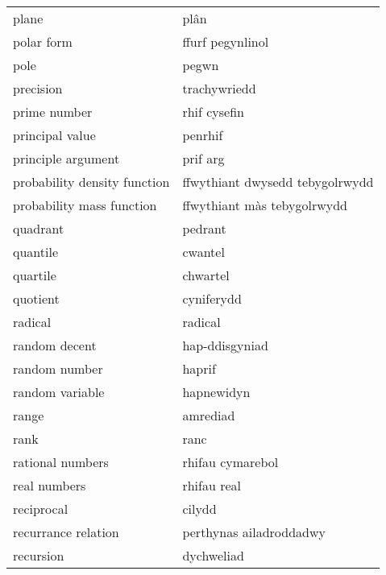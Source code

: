 \begin{supertabular}{p{0.22\textwidth}p{0.22\textwidth}}
                            plane &                             plân \\
                       polar form &                 ffurf pegynlinol \\
                             pole &                            pegwn \\
                        precision &                     trachywriedd \\
                     prime number &                     rhif cysefin \\
                  principal value &                          penrhif \\
               principle argument &                         prif arg \\
     probability density function &  ffwythiant dwysedd tebygolrwydd \\
        probability mass function &      ffwythiant màs tebygolrwydd \\
                         quadrant &                          pedrant \\
                         quantile &                          cwantel \\
                         quartile &                         chwartel \\
                         quotient &                       cyniferydd \\
                          radical &                          radical \\
                    random decent &                   hap-ddisgyniad \\
                    random number &                           haprif \\
                  random variable &                       hapnewidyn \\
                            range &                         amrediad \\
                             rank &                             ranc \\
                 rational numbers &                 rhifau cymarebol \\
                     real numbers &                      rhifau real \\
                       reciprocal &                           cilydd \\
              recurrance relation &          perthynas ailadroddadwy \\
                        recursion &                       dychweliad \\

\end{supertabular}

